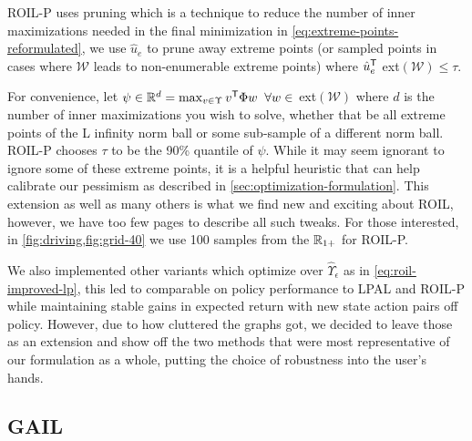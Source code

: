 \documentclass[10pt]{article}
\theoremstyle{plain}
\theoremstyle{remark}
\begin{document}
ROIL-P uses pruning which is a technique to reduce the number of inner maximizations needed in the final minimization in \eqref{eq:extreme-points-reformulated}, we use $\hat{u}_e$ to prune away extreme points (or sampled points in cases where $\mathcal{W}$ leads to non-enumerable extreme points) where $\hat{u}_e^{\mathsf{T}} $ ext$(\mathcal{W}) \leq \tau$. 

For convenience, let $\psi \in \mathbb{R}^d = \max_{v \in \Upsilon} v^{\mathsf{T}}\Phi w \;\; \forall w \in$ ext$(\mathcal{W})$ where $d$ is the number of inner maximizations you wish to solve, whether that be all extreme points of the L infinity norm ball or some sub-sample of a different norm ball. ROIL-P chooses $\tau$ to be the 90\% quantile of $\psi$. While it may seem ignorant to ignore some of these extreme points, it is a helpful heuristic that can help calibrate our pessimism as described in \cref{sec:optimization-formulation}. This extension as well as many others is what we find new and exciting about ROIL, however, we have too few pages to describe all such tweaks. For those interested, in \cref{fig:driving,fig:grid-40} we use 100 samples from the $\mathbb{R}_{1+}$ for ROIL-P.

We also implemented other variants which optimize over $\hat{\Upsilon}_\epsilon$ as in \eqref{eq:roil-improved-lp}, this led to comparable on policy performance to LPAL and ROIL-P while maintaining stable gains in expected return with new state action pairs off policy. However, due to how cluttered the graphs got, we decided to leave those as an extension and show off the two methods that were most representative of our formulation as a whole, putting the choice of robustness into the user's hands.

\subsection{GAIL}
\end{document}
